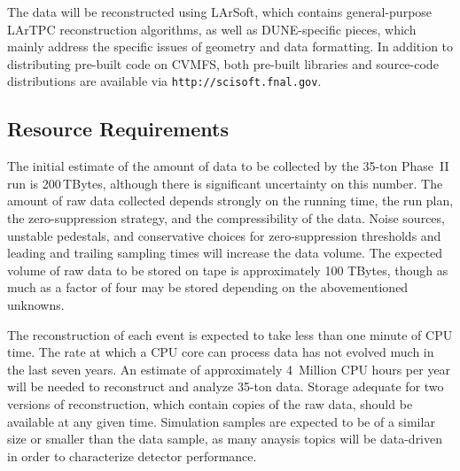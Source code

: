 The data will be reconstructed using LArSoft, which contains general-purpose LArTPC reconstruction algorithms,
as well as DUNE-specific pieces, which mainly address the specific issues of geometry and data formatting.
In addition to distributing pre-built code on CVMFS, both pre-built libraries and source-code distributions
are available via {\tt http://scisoft.fnal.gov}.


\subsection{Resource Requirements}
\label{sec:35t-resource-requirements}
The initial estimate of the amount of data to be collected by the 35-ton Phase~II run is 200\,TBytes,
although there is significant uncertainty on this number.  The amount of raw data collected
depends strongly on the running time, the run plan, the zero-suppression strategy, and the
compressibility of the data.  Noise sources, unstable pedestals, and conservative choices for zero-suppression
thresholds and leading and trailing sampling times will increase the data volume.
The expected volume of raw data to be stored on tape is approximately 100 TBytes, though as much as a factor
of four may be stored depending on the abovementioned unknowns.

The reconstruction of each event is expected to take less than one minute of CPU time.  The rate at which
a CPU core can process data has not evolved much in the last seven years.  An estimate of approximately
4~Million CPU hours per year will be needed to reconstruct and analyze 35-ton data.  Storage adequate for
two versions of reconstruction, which contain copies of the raw data, should be available at any given time.
Simulation samples are expected to be of a similar size or smaller than the data sample, as many anaysis
topics will be data-driven in order to characterize detector performance.
